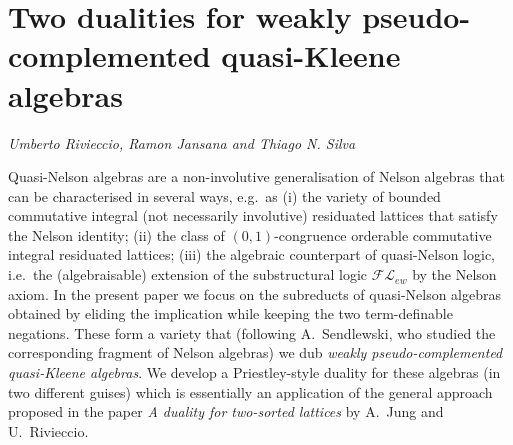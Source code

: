 \documentclass[../booklet.tex]{subfiles}
\begin{document}
\section[Two dualities for weakly pseudo-complemented quasi-Kleene algebras. {\it Umberto Rivieccio, Ramon Jansana and Thiago N. Silva}]{Two dualities for weakly pseudo-complemented quasi-Kleene algebras}
  

\begin{center}
  {\it Umberto Rivieccio, Ramon Jansana and Thiago N. Silva}
\end{center}

\vskip 0.8cm


Quasi-Nelson algebras are a non-involutive generalisation of Nelson algebras that
can be %
characterised in several %
ways,
e.g.~as (i) the variety of bounded commutative integral (not necessarily involutive)  residuated lattices that satisfy the Nelson identity; %
(ii) the class of $(0,1)$-congruence orderable commutative integral  residuated lattices; %
(iii) the algebraic counterpart of quasi-Nelson logic, i.e.~the 
(algebraisable) extension of the substructural logic
$\mathcal{FL}_{ew}$ %
by the Nelson axiom. 
In the present paper  we focus on the subreducts of quasi-Nelson algebras
obtained by eliding the implication while keeping the two term-definable negations.
These form a variety %
that 
(following A.~Sendlewski, who studied the corresponding fragment of Nelson algebras)
we dub \emph{weakly pseudo-complemented quasi-Kleene algebras}.
We develop a Priestley-style duality  for these algebras (in two different guises)
which is essentially an application of the %
general approach %
proposed in the paper \emph{A duality for two-sorted lattices}
by A.~Jung and U.~Rivieccio.


\end{document}
